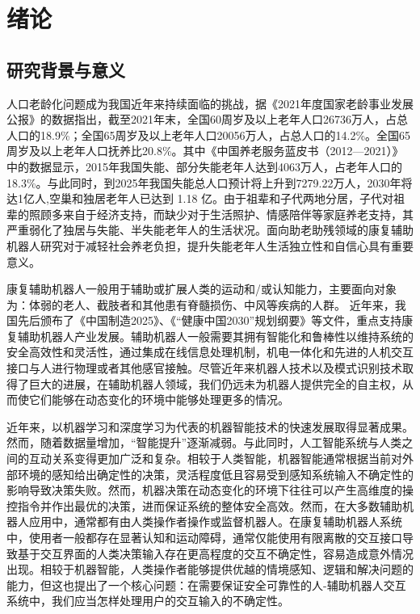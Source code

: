 
\chapter{绪论}

\section{研究背景与意义}
人口老龄化问题成为我国近年来持续面临的挑战，据《2021年度国家老龄事业发展公报》\cite{2021NianDuGuoJiaLaoLingShiYeFaZhanGongBao}的数据指出，截至2021年末，全国60周岁及以上老年人口26736万人，占总人口的18.9\%；全国65周岁及以上老年人口20056万人，占总人口的14.2\%。全国65周岁及以上老年人口抚养比20.8\%。其中《中国养老服务蓝皮书（2012—2021）》\cite{YangZhongGuoYangLaoFuWuLanPiShu201220212022}中的数据显示，2015年我国失能、部分失能老年人达到4063万人，占老年人口的18.3\%。与此同时，到2025年我国失能总人口预计将上升到7279.22万人，2030年将达1亿人,空巢和独居老年人已达到 1.18 亿。由于祖辈和子代两地分居，子代对祖辈的照顾多来自于经济支持，而缺少对于生活照护、情感陪伴等家庭养老支持，其严重弱化了独居与失能、半失能老年人的生活状况。面向助老助残领域的康复辅助机器人研究对于减轻社会养老负担，提升失能老年人生活独立性和自信心具有重要意义。

康复辅助机器人一般用于辅助或扩展人类的运动和/或认知能力，主要面向对象为：体弱的老人、截肢者和其他患有脊髓损伤、中风等疾病的人群。 近年来，我国先后颁布了《中国制造2025》\cite{ZhongGuoZhiZao2025_ZhongGuoZhengFuWang}、《“健康中国2030”规划纲要》\cite{LiuYangZhongGongZhongYangGuoWuYuanYinFaJianKangZhongGuo2030}等文件，重点支持康复辅助机器人产业发展。辅助机器人一般需要其拥有智能化和鲁棒性以维持系统的安全高效性和灵活性，通过集成在线信息处理机制，机电一体化和先进的人机交互接口与人进行物理或者其他感官接触。尽管近年来机器人技术以及模式识别技术取得了巨大的进展，在辅助机器人领域，我们仍远未为机器人提供完全的自主权，从而使它们能够在动态变化的环境中能够处理更多的情况。

近年来，以机器学习和深度学习为代表的机器智能技术的快速发展取得显著成果。然而，随着数据量增加，``智能提升''逐渐减弱。与此同时，人工智能系统与人类之间的互动关系变得更加广泛和复杂\cite{ZhaoQianTanKongZhiZhongDeGongXiangXinXiHeGongXiangZiZhu2021}。相较于人类智能，机器智能通常根据当前对外部环境的感知给出确定性的决策，灵活程度低且容易受到感知系统输入不确定性的影响导致决策失败。然而，机器决策在动态变化的环境下往往可以产生高维度的操控指令并作出最优的决策，进而保证系统的整体安全高效。然而，在大多数辅助机器人应用中，通常都有由人类操作者操作或监督机器人。在康复辅助机器人系统中，使用者一般都存在显著认知和运动障碍，通常仅能使用有限离散的交互接口导致基于交互界面的人类决策输入存在更高程度的交互不确定性，容易造成意外情况出现。相较于机器智能，人类操作者能够提供优越的情境感知、逻辑和解决问题的能力，但这也提出了一个核心问题：在需要保证安全可靠性的人-辅助机器人交互系统中，我们应当怎样处理用户的交互输入的不确定性。

